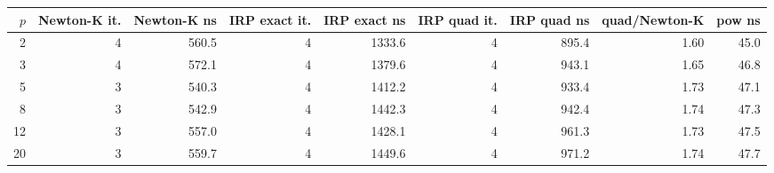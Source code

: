 \begin{tabular}{rrrrrrrrr}
\toprule
$p$ & Newton-K it. & Newton-K ns & IRP exact it. & IRP exact ns & IRP quad it. & IRP quad ns & quad/Newton-K & pow ns \\
\midrule
2 & 4 & 560.5 & 4 & 1333.6 & 4 & 895.4 & 1.60 & 45.0 \\
3 & 4 & 572.1 & 4 & 1379.6 & 4 & 943.1 & 1.65 & 46.8 \\
5 & 3 & 540.3 & 4 & 1412.2 & 4 & 933.4 & 1.73 & 47.1 \\
8 & 3 & 542.9 & 4 & 1442.3 & 4 & 942.4 & 1.74 & 47.3 \\
12 & 3 & 557.0 & 4 & 1428.1 & 4 & 961.3 & 1.73 & 47.5 \\
20 & 3 & 559.7 & 4 & 1449.6 & 4 & 971.2 & 1.74 & 47.7 \\
\bottomrule
\end{tabular}
